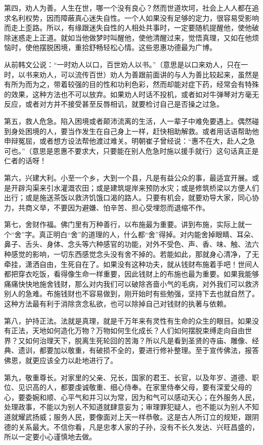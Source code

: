 \documentclass[12pt,UTF8]{ctexbook}
\begin{document}
第四，劝人为善。人生在世，哪一个没有良心？然而世道坎坷，社会上人人都在追求名利权势，因而障蔽真心迷失自性。一个人如果没有足够的定力，很容易受影响而走上歪路。所以，有缘跟迷失自性的人相处共事时，一定要随机提醒他，使他破除迷惑走上正道。就如当他做梦时叫醒他，使他清醒过来，觉悟真理，又如在他烦恼时，使他摆脱困境，重拾舒畅轻松心情。这些恩惠功德最为广博。

从前韩文公说：“一时劝人以口，百世劝人以书。”（意思是以口来劝人，只在一时，以书来劝人，可以流传百世）劝人为善跟前面讲的与人为善比较起来，虽然是有所为而为之，带着较强的目的性和功利色彩，然而却能对症下药，经常会有特殊的效果，这种方法也不可以放弃。如果劝人时话不投机，或者如对牛弹琴对方毫无反应，或者对方并不接受甚至反唇相讥，就要检讨自己是否操之过急。

第五，救人危急。陷入困境或者颠沛流离的生活，人一辈子中难免要遇上。偶然碰到身处困境的人，要当作发生在自己身上一样，赶快相助解救。或者用话语帮助他申辩冤屈，或者想方设法帮他渡过难关。明朝崔子曾经说：“惠不在大，赴人之急可也。”（意思是恩惠不要求大，只要能在别人危急时施以援手就行）这句话真正是仁者的话呀！

第六，兴建大利。小至一个乡，大到一个县，凡是有益公众的事，最适宜开展。或是开辟沟渠来引水灌溉农田；或是建筑堤岸来预防水灾；或是修筑桥梁以方便人们出行；或是施送茶饭以救济饥饿口渴的路人。只要有机会，就要劝导大家，同心协力，共商义举，不要因为避嫌、怕辛苦、担心受埋怨而退缩不作。

第七，舍财作福。佛门里有万种善行，以布施最为重要。讲到布施，实际上就一个“舍”字。真正明白“舍”的道理的人，什么都“舍”得掉。对内能舍掉眼睛、耳朵、鼻子、舌头、身体、念头等六种感官的功能，对外不受色、声、香、味、触、法六种感觉的影响，一切东西感觉念头没有舍不掉的。若能如此，那就身心清净，了无牵挂，潇洒自由，生死自在了。如果没有这种功夫，就从钱财布施着手吧！世间人都把穿衣吃饭，看得像生命一样重要，因此钱财上的布施也最为重要。如果我能够痛痛快快地施舍钱财，那么对内我们可以破除吝啬小气的毛病，对外我们可以救济别人的急难。布施钱财也不容易做到，刚开始时有些勉强，坚持下去也就自然了。这种方法最有利于消除贪念私欲，也可以除掉自己对钱财的执著与依赖。

第八，护持正法。法就是真理，就是千万年来有灵性有生命的众生的眼目。如果没有正法，天地如何造化万物？万物如何生化成长？人们如何摆脱束缚走向自由世界？又如何治理天下，脱离生死轮回的苦海？所以凡是看到圣贤的寺庙、雕像、经典、遗训，都要加以敬重，有破损不全的，要进行修补整理。至于宣传佛法，报答佛恩，就更应该全力以赴地进行了。

第九，敬重尊长。对家里的父亲、兄长，国家的君王、长官，以及年岁、道德、职位、见识高的人，都要虔诚敬重、细心侍奉。在家里侍奉父母，要有深爱父母的心，要委婉和顺、心平气和并习以为常，因为和气可以感动天心；在外服务人民，处理政事，不能以为别人不知道就肆意妄为；审理罪犯疑人，也不能以为别人不知道就耀武扬威；服务人民，要像面对上天一样恭敬。这是古人所订立的规矩，跟阴德的关系最大。不信你看，凡是忠孝人家的子孙，没有不长久发达、兴旺昌盛的，所以一定要小心谨慎地去做。
\end{document}
